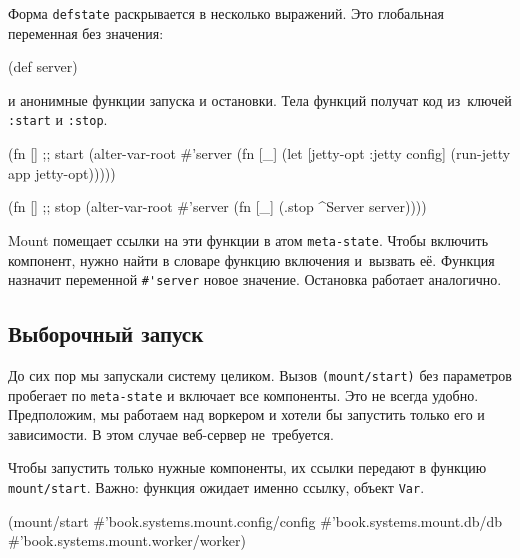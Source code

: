 Форма \verb|defstate| раскрывается в несколько выражений. Это глобальная
переменная без значения:


\begin{english}
  \begin{clojure}
(def server)
  \end{clojure}
\end{english}

\noindent
и анонимные функции запуска и остановки. Тела функций получат код из~ключей
\verb|:start| и \verb|:stop|.

\begin{english}
  \begin{clojure}
(fn [] ;; start
  (alter-var-root #'server
   (fn [_]
     (let [{jetty-opt :jetty} config]
       (run-jetty app jetty-opt)))))

(fn [] ;; stop
  (alter-var-root #'server
   (fn [_]
     (.stop ^Server server))))
  \end{clojure}
\end{english}

Mount помещает ссылки на эти функции в атом \verb|meta-state|. Чтобы включить
компонент, нужно найти в словаре функцию включения и~вызвать её. Функция
назначит переменной \verb|#'server| новое значение. Остановка работает
аналогично.

\subsection{Выборочный запуск}

\label{mount-selective}

До сих пор мы запускали систему целиком. Вызов \verb|(mount/start)| без
параметров пробегает по \verb|meta-state| и включает все компоненты. Это не
всегда удобно. Предположим, мы работаем над воркером и хотели бы запустить
только его и зависимости. В этом случае веб-сервер не~требуется.

Чтобы запустить только нужные компоненты, их ссылки передают в функцию
\verb|mount/start|. Важно: функция ожидает именно ссылку, объект \verb|Var|.

\begin{english}
  \begin{clojure}
(mount/start
  #'book.systems.mount.config/config
  #'book.systems.mount.db/db
  #'book.systems.mount.worker/worker)
  \end{clojure}
\end{english}

